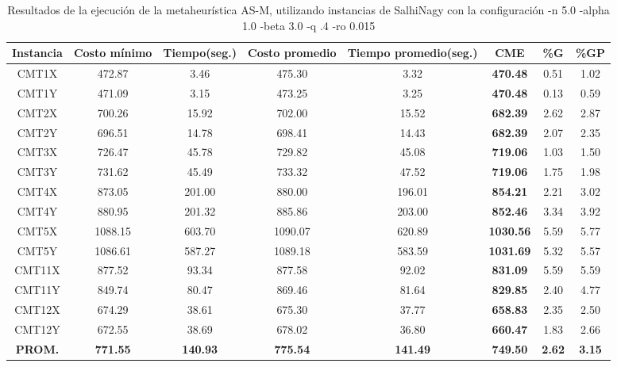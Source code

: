 \begin{table}[h]
\caption{Resultados de la ejecución de la metaheurística AS-M, utilizando instancias de SalhiNagy con la configuración -n 5.0 -alpha 1.0 -beta 3.0 -q .4 -ro 0.015}
\centering
\small
\begin{tabular}{c c c c c c c c}
\hline\hline
Instancia & Costo mínimo & Tiempo(seg.) & Costo promedio & Tiempo promedio(seg.) & CME & \%G & \%GP \\ [0.5ex]
\hline
CMT1X & 472.87 & 3.46 & 
475.30 & 3.32 & \bf{470.48} & 
0.51 & 1.02\\CMT1Y & 471.09 & 3.15 & 
473.25 & 3.25 & \bf{470.48} & 
0.13 & 0.59\\CMT2X & 700.26 & 15.92 & 
702.00 & 15.52 & \bf{682.39} & 
2.62 & 2.87\\CMT2Y & 696.51 & 14.78 & 
698.41 & 14.43 & \bf{682.39} & 
2.07 & 2.35\\CMT3X & 726.47 & 45.78 & 
729.82 & 45.08 & \bf{719.06} & 
1.03 & 1.50\\CMT3Y & 731.62 & 45.49 & 
733.32 & 47.52 & \bf{719.06} & 
1.75 & 1.98\\CMT4X & 873.05 & 201.00 & 
880.00 & 196.01 & \bf{854.21} & 
2.21 & 3.02\\CMT4Y & 880.95 & 201.32 & 
885.86 & 203.00 & \bf{852.46} & 
3.34 & 3.92\\CMT5X & 1088.15 & 603.70 & 
1090.07 & 620.89 & \bf{1030.56} & 
5.59 & 5.77\\CMT5Y & 1086.61 & 587.27 & 
1089.18 & 583.59 & \bf{1031.69} & 
5.32 & 5.57\\CMT11X & 877.52 & 93.34 & 
877.58 & 92.02 & \bf{831.09} & 
5.59 & 5.59\\CMT11Y & 849.74 & 80.47 & 
869.46 & 81.64 & \bf{829.85} & 
2.40 & 4.77\\CMT12X & 674.29 & 38.61 & 
675.30 & 37.77 & \bf{658.83} & 
2.35 & 2.50\\CMT12Y & 672.55 & 38.69 & 
678.02 & 36.80 & \bf{660.47} & 
1.83 & 2.66\\\bf{PROM.} & 
\bf{771.55} & \bf{140.93} & \bf{775.54} & \bf{141.49} & \bf{749.50} & \bf{2.62} & \bf{3.15}\\[1ex]\hline
\end{tabular}
\label{table:nonlin}
\end{table}
